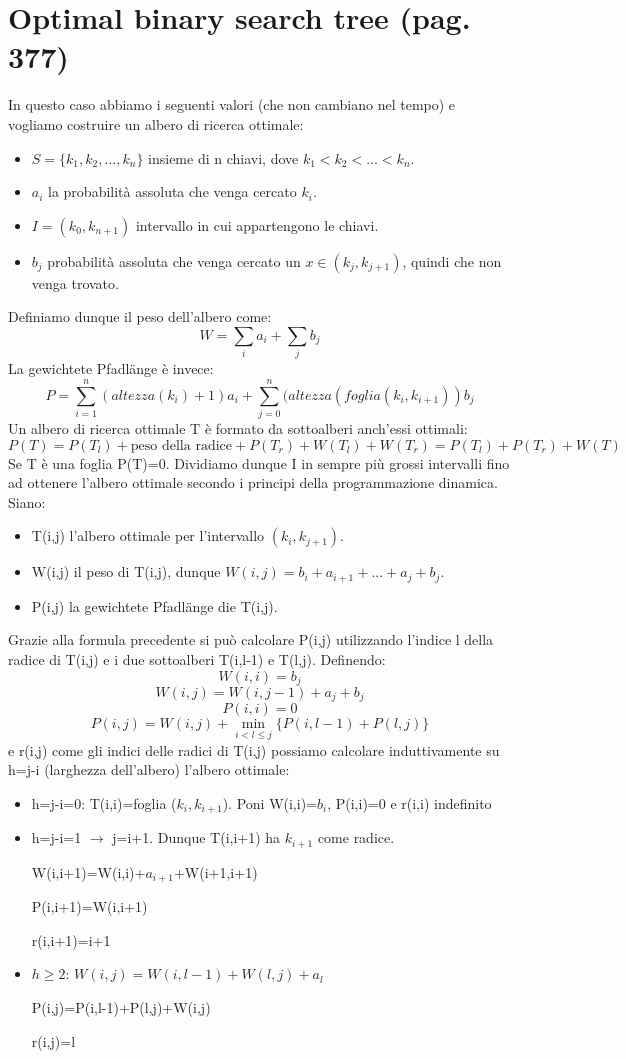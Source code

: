 \documentclass[a4paper]{book}
\begin{document}
\section{Optimal binary search tree (pag. 377)}
In questo caso abbiamo i seguenti valori (che non cambiano nel tempo) e vogliamo costruire un albero di ricerca ottimale:
\begin{itemize}
\item $S=\{k_1,k_2, ..., k_n \}$ insieme di n chiavi, dove $k_1<k_2<...<k_n$.
\item $a_i$ la probabilità assoluta che venga cercato $k_i$.
\item $I=(k_0,k_{n+1})$ intervallo in cui appartengono le chiavi.
\item $b_j$ probabilità assoluta che venga cercato un $x \in (k_j, k_{j+1})$, quindi che non venga trovato.
\end{itemize}
Definiamo dunque il peso dell'albero come:
$$W=\sum_i a_i + \sum_j b_j$$
La gewichtete Pfadlänge  è invece:
$$ P= \sum_{i=1}^n (altezza(k_i)+1)a_i+\sum_{j=0}^n (altezza(foglia(k_i,k_{i+1}))b_j$$
Un albero di ricerca ottimale T è formato da sottoalberi anch'essi ottimali: 
$$ P(T)= P(T_l)+\mbox{peso della radice}+P(T_r)+W(T_l)+W(T_r)=P(T_l)+P(T_r)+W(T)$$
Se T è una foglia P(T)=0. Dividiamo dunque I in sempre più grossi intervalli fino ad ottenere l'albero ottimale secondo i principi della programmazione dinamica. Siano:
\begin{itemize}
\item T(i,j) l'albero ottimale per l'intervallo $(k_i,k_{j+1})$.
\item W(i,j) il peso di T(i,j), dunque $W(i,j)=b_i+a_{i+1}+...+a_j+b_j$.
\item P(i,j) la gewichtete Pfadlänge die T(i,j).
\end{itemize}
Grazie alla formula precedente si può calcolare P(i,j) utilizzando l'indice l della radice di T(i,j) e i due sottoalberi T(i,l-1) e T(l,j). Definendo:
$$W(i,i)=b_j$$
$$W(i,j)=W(i,j-1)+a_j+b_j$$
$$P(i,i)=0$$
$$P(i,j)=W(i,j)+\min_{i<l\leq j} \{P(i,l-1)+P(l,j)\}$$
e r(i,j) come gli indici delle radici di T(i,j) possiamo calcolare induttivamente su h=j-i (larghezza dell'albero) l'albero ottimale:
\begin{itemize}
\item h=j-i=0: T(i,i)=foglia ($k_i, k_{i+1}$). Poni W(i,i)=$b_i$, P(i,i)=0 e r(i,i) indefinito
\item h=j-i=1 $\rightarrow$ j=i+1. Dunque T(i,i+1) ha $k_{i+1}$ come radice. 

W(i,i+1)=W(i,i)+$a_{i+1}$+W(i+1,i+1)

P(i,i+1)=W(i,i+1)

r(i,i+1)=i+1
\item $h\geq 2$: $W(i,j)=W(i,l-1)+W(l,j)+a_l$

P(i,j)=P(i,l-1)+P(l,j)+W(i,j)

r(i,j)=l
\end{itemize}
\end{document}
